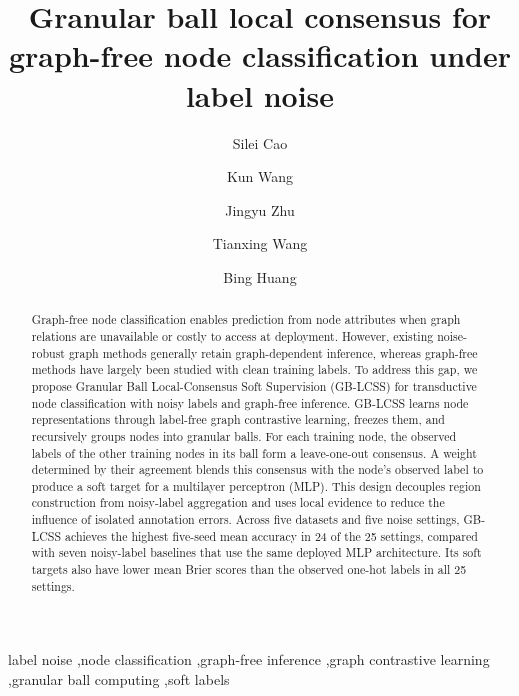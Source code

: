 \documentclass[10pt,letterpaper,nopreprintline]{elsarticle}
\theoremstyle{definition}
\theoremstyle{plain}
\begin{document}
\SetAlgoNoLine
\begin{frontmatter}
\title{Granular ball local consensus for graph-free node classification under label noise}
\author[a]{Silei Cao}
\author[a]{Kun Wang}
\author[b]{Jingyu Zhu}
\author[k]{Tianxing Wang}
\author[a]{Bing Huang}
\address[a]{School of Computer Science, Nanjing Audit University, Nanjing 211815, PR China}
\address[b]{School of Statistics and Data Science, Nanjing Audit University, Nanjing 211815, PR China}
\address[k]{School of Business, Nanjing Audit University, Nanjing 211815, PR China}
\begin{abstract}
Graph-free node classification enables prediction from node attributes when graph relations are unavailable or costly to access at deployment. However, existing noise-robust graph methods generally retain graph-dependent inference, whereas graph-free methods have largely been studied with clean training labels. To address this gap, we propose Granular Ball Local-Consensus Soft Supervision (GB-LCSS) for transductive node classification with noisy labels and graph-free inference. GB-LCSS learns node representations through label-free graph contrastive learning, freezes them, and recursively groups nodes into granular balls. For each training node, the observed labels of the other training nodes in its ball form a leave-one-out consensus. A weight determined by their agreement blends this consensus with the node's observed label to produce a soft target for a multilayer perceptron (MLP). This design decouples region construction from noisy-label aggregation and uses local evidence to reduce the influence of isolated annotation errors. Across five datasets and five noise settings, GB-LCSS achieves the highest five-seed mean accuracy in 24 of the 25 settings, compared with seven noisy-label baselines that use the same deployed MLP architecture. Its soft targets also have lower mean Brier scores than the observed one-hot labels in all 25 settings.
\end{abstract}
\begin{keyword}
label noise \sep node classification \sep graph-free inference \sep graph contrastive learning \sep granular ball computing \sep soft labels
\end{keyword}
\end{frontmatter}

\FloatBarrier
\end{document}
